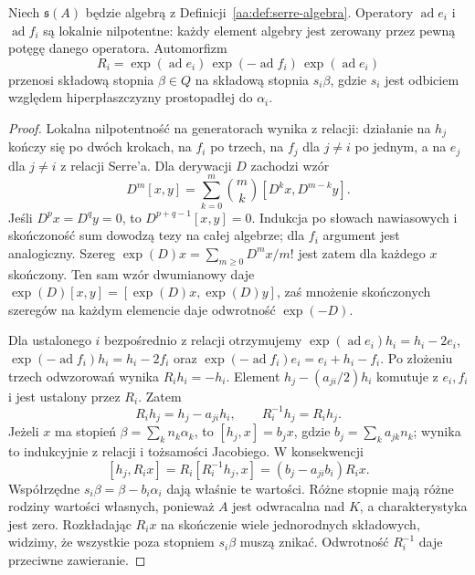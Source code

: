 \begin{lemat}
\label{aa:lem:serre-reflections}
Niech $\mathfrak s(A)$ będzie algebrą z Definicji~\ref{aa:def:serre-algebra}. Operatory $\operatorname{ad}e_i$ i $\operatorname{ad}f_i$ są lokalnie nilpotentne: każdy element algebry jest zerowany przez pewną potęgę danego operatora. Automorfizm
\[
 R_i=\exp(\operatorname{ad}e_i)\,
      \exp(-\operatorname{ad}f_i)\,
      \exp(\operatorname{ad}e_i)
\]
przenosi składową stopnia $\beta\in Q$ na składową stopnia $s_i\beta$, gdzie $s_i$ jest odbiciem względem hiperpłaszczyzny prostopadłej do $\alpha_i$.
\end{lemat}
\begin{proof}
Lokalna nilpotentność na generatorach wynika z relacji: działanie na $h_j$ kończy się po dwóch krokach, na $f_i$ po trzech, na $f_j$ dla $j\ne i$ po jednym, a na $e_j$ dla $j\ne i$ z relacji Serre'a. Dla derywacji $D$ zachodzi wzór
\[
 D^m[x,y]=\sum_{k=0}^m\binom{m}{k}[D^kx,D^{m-k}y].
\]
Jeśli $D^p x=D^q y=0$, to $D^{p+q-1}[x,y]=0$. Indukcja po słowach nawiasowych i skończoność sum dowodzą tezy na całej algebrze; dla $f_i$ argument jest analogiczny. Szereg $\exp(D)x=\sum_{m\ge0}D^mx/m!$ jest zatem dla każdego $x$ skończony. Ten sam wzór dwumianowy daje $\exp(D)[x,y]=[\exp(D)x,\exp(D)y]$, zaś mnożenie skończonych szeregów na każdym elemencie daje odwrotność $\exp(-D)$.

Dla ustalonego $i$ bezpośrednio z relacji otrzymujemy
$\exp(\operatorname{ad}e_i)h_i=h_i-2e_i$,
$\exp(-\operatorname{ad}f_i)h_i=h_i-2f_i$ oraz
$\exp(-\operatorname{ad}f_i)e_i=e_i+h_i-f_i$.
Po złożeniu trzech odwzorowań wynika $R_i h_i=-h_i$. Element $h_j-(a_{ji}/2)h_i$ komutuje z $e_i,f_i$ i jest ustalony przez $R_i$. Zatem
\[
 R_i h_j=h_j-a_{ji}h_i,\qquad R_i^{-1}h_j=R_i h_j.
\]
Jeżeli $x$ ma stopień $\beta=\sum_k n_k\alpha_k$, to
$[h_j,x]=b_j x$, gdzie $b_j=\sum_k a_{jk}n_k$; wynika to indukcyjnie z relacji i tożsamości Jacobiego. W konsekwencji
\[
 [h_j,R_ix]=R_i[R_i^{-1}h_j,x]
 =(b_j-a_{ji}b_i)R_ix.
\]
Współrzędne $s_i\beta=\beta-b_i\alpha_i$ dają właśnie te wartości. Różne stopnie mają różne rodziny wartości własnych, ponieważ $A$ jest odwracalna nad $K$, a charakterystyka jest zero. Rozkładając $R_ix$ na skończenie wiele jednorodnych składowych, widzimy, że wszystkie poza stopniem $s_i\beta$ muszą znikać. Odwrotność $R_i^{-1}$ daje przeciwne zawieranie.
\end{proof}

